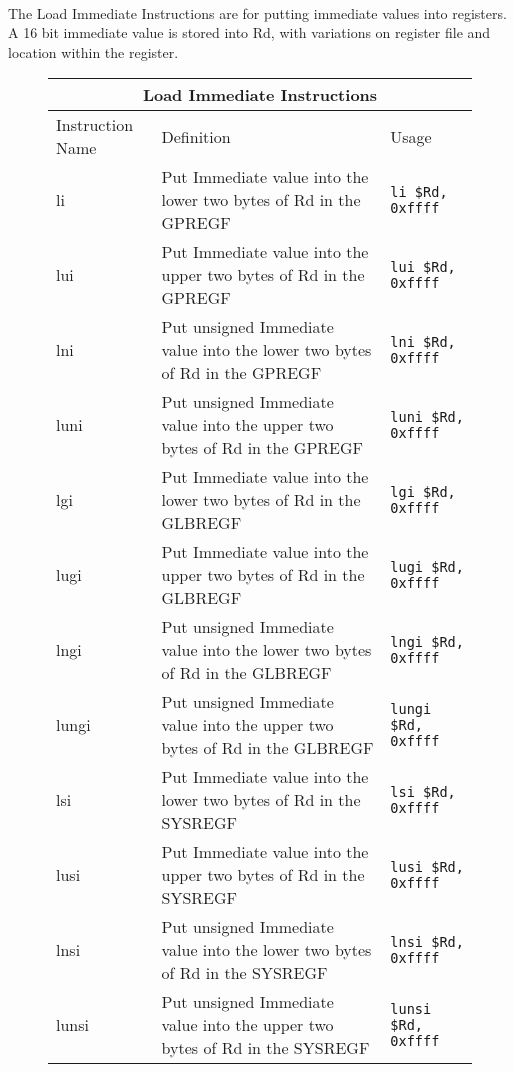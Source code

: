 \documentclass[letterpaper, 11pt]{article}
\begin{document}
\paragraph{} The Load Immediate Instructions are for putting immediate values into registers. A 16 bit immediate value is stored into Rd, with variations on
register file and location within the register.
\begin{figure}[!h]
	\begin{center}
		\begin{tabular}{|l|l|l|}
			\hline
			\multicolumn{3}{c}{Load Immediate Instructions} \\ \hline
			Instruction Name	& Definition																	& Usage 						\\ \hline
			li					& Put Immediate value into the lower two bytes of Rd in the GPREGF				& \texttt{li \$Rd, 0xffff}		\\ \hline
			lui					& Put Immediate value into the upper two bytes of Rd in the GPREGF				& \texttt{lui \$Rd, 0xffff}		\\ \hline
			lni					& Put unsigned Immediate value into the lower two bytes of Rd in the GPREGF		& \texttt{lni \$Rd, 0xffff}		\\ \hline
			luni				& Put unsigned Immediate value into the upper two bytes of Rd in the GPREGF		& \texttt{luni \$Rd, 0xffff}	\\ \hline

			lgi					& Put Immediate value into the lower two bytes of Rd in the GLBREGF				& \texttt{lgi \$Rd, 0xffff}		\\ \hline
			lugi				& Put Immediate value into the upper two bytes of Rd in the GLBREGF				& \texttt{lugi \$Rd, 0xffff}	\\ \hline
			lngi				& Put unsigned Immediate value into the lower two bytes of Rd in the GLBREGF	& \texttt{lngi \$Rd, 0xffff}	\\ \hline
			lungi				& Put unsigned Immediate value into the upper two bytes of Rd in the GLBREGF	& \texttt{lungi \$Rd, 0xffff}	\\ \hline


			lsi					& Put Immediate value into the lower two bytes of Rd in the SYSREGF				& \texttt{lsi \$Rd, 0xffff}		\\ \hline
			lusi				& Put Immediate value into the upper two bytes of Rd in the SYSREGF				& \texttt{lusi \$Rd, 0xffff}	\\ \hline
			lnsi				& Put unsigned Immediate value into the lower two bytes of Rd in the SYSREGF	& \texttt{lnsi \$Rd, 0xffff}	\\ \hline
			lunsi				& Put unsigned Immediate value into the upper two bytes of Rd in the SYSREGF	& \texttt{lunsi \$Rd, 0xffff}	\\ \hline
		\end{tabular} 
	\end{center}
	
\end{figure}
\end{document}
